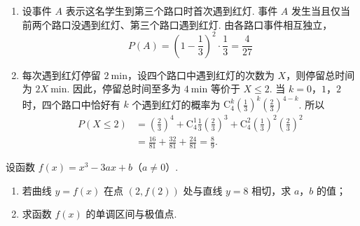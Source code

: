 \begin{solution}
\begin{enumerate}
\item 设事件 \(A\) 表示这名学生到第三个路口时首次遇到红灯.
事件 \(A\) 发生当且仅当前两个路口没遇到红灯、第三个路口遇到红灯.
由各路口事件相互独立，
\[
P(A)=\left(1-\frac{1}{3}\right)^2\cdot\frac{1}{3}=\frac{4}{27}
\]

\item 每次遇到红灯停留 \(2\mathrm{~min}\)，设四个路口中遇到红灯的次数为 \(X\)，则停留总时间为 \(2X\mathrm{~min}\).
因此，停留总时间至多为 \(4\mathrm{~min}\) 等价于 \(X\leqslant 2\).
当 \(k=0\)，\(1\)，\(2\) 时，四个路口中恰好有 \(k\) 个遇到红灯的概率为
\(\mathrm C_4^k\left(\frac{1}{3}\right)^k\left(\frac{2}{3}\right)^{4-k}\).
所以
\[
\begin{aligned}
P(X\leqslant 2)
&=\left(\frac{2}{3}\right)^4+\mathrm C_4^1\frac{1}{3}\left(\frac{2}{3}\right)^3+\mathrm C_4^2\left(\frac{1}{3}\right)^2\left(\frac{2}{3}\right)^2\\
&=\frac{16}{81}+\frac{32}{81}+\frac{24}{81}=\frac{8}{9}.
\end{aligned}
\]
\end{enumerate}
\end{solution}

\begin{problem}
设函数 \( f(x) = x^3 - 3ax + b \)（\(a \neq 0\)）.
\begin{enumerate}
\item 若曲线 \( y = f(x) \) 在点 \((2, f(2))\) 处与直线 \( y = 8 \) 相切，求 \(a\)，\(b\) 的值；
\item 求函数 \( f(x) \) 的单调区间与极值点.
\end{enumerate}

\end{problem}

